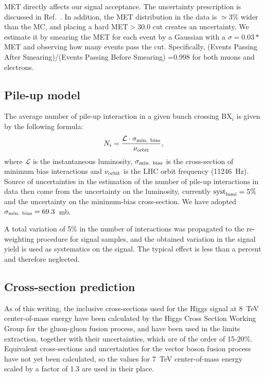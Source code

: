 MET directly affects our signal acceptance. 
The uncertainty prescription is discussed in Ref.~\cite{met}.
In addition, the MET distribution in the data is $\simeq$3\% wider 
than the MC, and placing a hard MET$>30.0$ cut creates an uncertainty. 
We estimate it by smearing the MET for each event by a Gaussian with 
a $\sigma =0.03*$MET and observing how many events pass the cut. 
Specifically, (Events Passing After Smearing)/(Events Passing Before Smearing) 
=0.998 for both muons and electrons.


\subsection{Pile-up model}


The average number of pile-up interaction in a given bunch crossing
BX$_{i}$ is given by the following formula:
\begin{equation}
N_{i} = \frac{\mathcal{L} \cdot \sigma_{\textnormal{min. bias}}}{\nu_{\textnormal{orbit}}},
\end{equation}
where $\mathcal{L}$ is the instantaneous luminosity,
$\sigma_{\textnormal{min. bias}}$ is the cross-section of minimum bias
interactions and $\nu_{\textnormal{orbit}}$ is the LHC orbit frequency
(11246~Hz).  Source of uncertainties in the estimation of the number
of pile-up interactions in data then come from the uncertainty on the
luminosity, currently $\textnormal{syst}_{\textnormal{lumi}}=5\%$ and
the uncertainty on the minimum-bias cross-section. We have adopted
$\sigma_{\textnormal{min. bias}}=69.3$~mb.

A total variation of 5\% in the number of interactions was propagated to the
re-weighting procedure for signal samples, and the obtained variation
in the signal yield is used as systematics on the signal. The typical
effect is less than a percent and therefore neglected.


\subsection{Cross-section prediction}


As of this writing, the inclusive cross-sections used for the Higgs
signal at 8~TeV center-of-mass energy have been calculated by the
Higgs Cross Section Working Group
\cite{LHCHiggsCrossSectionWorkingGroup:2011ti} for the
gluon-gluon fusion process, and have been used in the limits
extraction, together with their uncertainties, which are of the
order of 15-20\%. Equivalent cross-sections and uncertainties for the
vector boson fusion process have not yet been calculated, so the values
for 7~TeV center-of-mass energy scaled by a factor of 1.3 are used in
their place.

